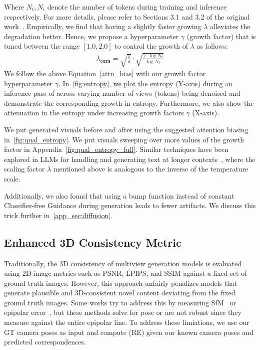 Where $N_t, N_i$ denote the number of tokens during training and inference respectively. For more details, please refer to Sections 3.1 and 3.2 of the original work~\cite{jin2023training}. Empirically, we find that having a slightly faster growing $\lambda$ alleviates the degradation better. Hence, we propose a hyperparameter $\gamma$ (growth factor) that is tuned between the range $[1.0,2.0]$ to control the growth of $\lambda$ as follows: 
\begin{equation}
    \begin{aligned}
    \lambda_\texttt{ours} = \sqrt{\frac{1}{d}} \cdot \sqrt{\frac{\gamma \cdot \log N_i}{\log N_t}}
    \end{aligned}
    \label{attn_bias}
\end{equation}
We follow the above Equation~\eqref{attn_bias} with our growth factor hyperparameter $\gamma$. In~\cref{fig:entropy}, we plot the entropy (Y-axis) during an inference pass of \ourmodel across varying number of views (tokens) being denoised and demonstrate the corresponding growth in entropy. Furthermore, we also show the attenuation in the entropy under increasing growth factors $\gamma$ (X-axis). 

We put generated visuals before and after using the suggested attention biasing in~\cref{fig:qual_entropy}. We put visuals sweeping over more values of the growth factor in Appendix~\cref{fig:qual_entropy_full}. Similar techniques have been explored in LLMs for handling and generating text at longer contexts~\cite{peng2023yarn,veličković2024softmax}, where the scaling factor $\lambda$ mentioned above is analogous to the inverse of the temperature scale. 

Additionally, we also found that using a bump function instead of constant Classifier-free Guidance during generation leads to fewer artifacts. We discuss this trick further in~\cref{app_sec:diffusion}.



 




\subsection{Enhanced 3D Consistency Metric}
\label{ssec:consistencymetric}



Traditionally, the 3D consistency of multiview generation models is evaluated using 2D image metrics such as PSNR, LPIPS, and SSIM against a fixed set of ground truth images. However, this approach unfairly penalizes models that generate plausible and 3D-consistent novel content deviating from the fixed ground truth images.
Some works try to address this by measuring SfM~\cite{SFM,fridman2024scenescape} or epipolar error~\cite{muller2024multidiff,TrainNVSDM3}, but these methods solve for pose or are not robust since they measure against the entire epipolar line. To address these limiations, we use our GT camera poses as input and compute \reprojectionerror (RE) given our known camera poses and predicted correspondences.




